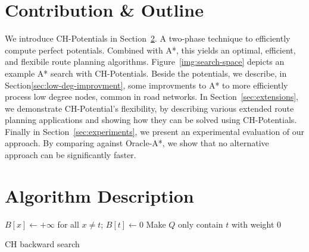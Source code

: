 \documentclass[letterpaper]{article} %
\begin{document}
\section{Contribution \& Outline}

We introduce CH-Potentials in Section~\ref{sec:main-algo}. 
A two-phase technique to efficiently compute perfect potentials.
Combined with A*, this yields an optimal, efficient, and flexibile route planning algorithms.
Figure~\ref{img:search-space} depicts an example A* search with CH-Potentials.
Beside the potentials, we describe, in Section\ref{sec:low-deg-improvment}, some improvments to A* to more efficiently process low degree nodes, common in road networks.
In Section~\ref{sec:extensions}, we demonstrate CH-Potential's flexibility, by describing various extended route planning applications and showing how they can be solved using CH-Potentials.
Finally in Section~\ref{sec:experiments}, we present an experimental evaluation of our approach. 
By comparing against Oracle-A*, we show that no alternative approach can be significantly faster.


\section{Algorithm Description}

\label{sec:main-algo}

\begin{algorithm2e}
$B[x] \leftarrow +\infty$ for all $x\neq t$;
$B[t] \leftarrow 0$\;
Make $Q$ only contain $t$ with weight $0$\;
\caption{CH backward search}
\label{algo:ch-backward}
\end{algorithm2e}
\end{document}
